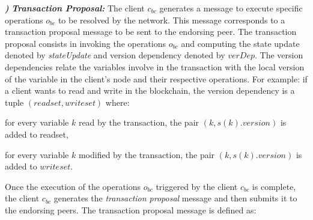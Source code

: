 \documentclass[conference]{llncs}
\newcounter{paranum}
\newcommand{\Par}{\vspace{10pt}\noindent\textbf{\refstepcounter{paranum}\theparanum}\textbf\textit) }
\begin{document}
\Par{\textit{\textbf{Transaction Proposal:}}}
The client $c_{bc}$ generates a message to execute specific operations $o_{bc}$ to be resolved by the network. This message corresponds to a transaction proposal message to be sent to the endorsing peer. The transaction proposal consists in invoking the operations $o_{bc}$ and computing the state update denoted by \textit{stateUpdate} and version dependency denoted by $\textit{verDep}$. The version dependencies relate the variables involve in the transaction with the local version of the variable in the client's node and their respective operations. For example: if a client wants to read and write in the blockchain, the version dependency is a tuple $\left(readset,writeset\right)$ where:

\begin{compactitem}
\item for every variable $k$ read by the transaction, the pair $(k,s(k).version)$ is added to readset,
\item for every variable $k$ modified by the transaction, the pair $(k,s(k).version)$ is added to $writeset$.
\end{compactitem}

Once the execution of the operations $o_{bc}$ triggered by the client $c_{bc}$ is complete, the client $c_{bc}$ generates the \textit{transaction proposal} message and then submits it to the endorsing peers. The transaction proposal message is defined as:

\noindent{}
\end{document}
